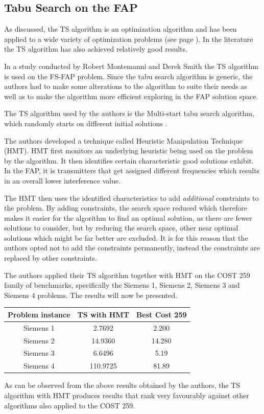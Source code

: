 \subsection{Tabu Search on the FAP}
As discussed, the TS algorithm is an optimization algorithm and has been applied to a wide variety of optimization problems (see page \pageref{sec:TSIntroduction}). In the literature the TS algorithm has also achieved relatively good results.

In a study conducted by Robert Montemanni and Derek Smith \cite{TabuMontemanniSmith} the TS algorithm is used on the FS-FAP problem. Since the tabu search algorithm is generic, the authors had to make some alterations to the algorithm to suite their needs as well as to make the algorithm more efficient exploring in the FAP solution space.

The TS algorithm used by the authors is the Multi-start tabu search algorithm, which randomly starts on different initial solutions \cite{TabuMontemanniSmith}.

The authors developed a technique called Heuristic Manipulation Technique (HMT). HMT first monitors an underlying heuristic being used on the problem by the algorithm\cite{TabuMontemanniSmith}. It then identifies certain characteristic good solutions exhibit. In the FAP, it is transmitters that get assigned different frequencies which results in an overall lower interference value\cite{TabuMontemanniSmith}.

The HMT then uses the identified characteristics to add \emph{additional} constraints to the problem\cite{TabuMontemanniSmith}. By adding constraints, the search space reduced which therefore makes it easier for the algorithm to find an optimal solution, as there are fewer solutions to consider, but by reducing the search space, other near optimal solutions which might be far better are excluded\cite{TabuMontemanniSmith}. It is for this reason that the authors opted not to add the constraints permanently, instead the constraints are replaced by other constraints\cite{TabuMontemanniSmith}.

The authors applied their TS algorithm together with HMT on the COST 259 family of benchmarks, specifically the Siemens 1, Siemens 2, Siemens 3 and Siemens 4 problems.  The results will now be presented.
\begin{table}
\centering
	\begin{tabular}{| c | c | c |}
		\hline
		Problem instance & TS with HMT & Best Cost 259 \\ \hline
		Siemens 1 & 2.7692 & 2.200 \\ \hline
		Siemens 2 & 14.9360 & 14.280 \\ \hline
		Siemens 3 & 6.6496 & 5.19 \\ \hline
		Siemens 4 & 110.9725 & 81.89 \\ \hline
	\end{tabular}
\end{table}
As can be observed from the above results obtained by the authors, the TS algorithm with HMT produces results that rank very favourably against other algorithms also applied to the COST 259.

